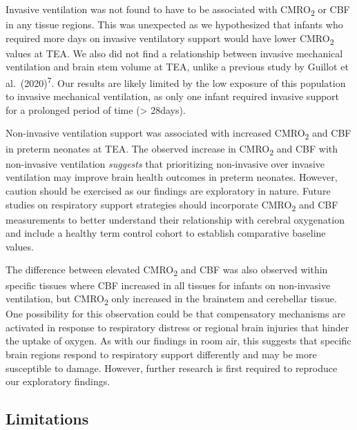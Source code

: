 \documentclass[
  letterpaper,
  DIV=11,
  numbers=noendperiod]{scrartcl}
\begin{document}
Invasive ventilation was not found to have to be associated with
CMRO\textsubscript{2} or CBF in any tissue regions. This was unexpected
as we hypothesized that infants who required more days on invasive
ventilatory support would have lower CMRO\textsubscript{2} values at
TEA. We also did not find a relationship between invasive mechanical
ventilation and brain stem volume at TEA, unlike a previous study by
Guillot et al.~(2020)\textsuperscript{7}. Our results are likely limited
by the low exposure of this population to invasive mechanical
ventilation, as only one infant required invasive support for a
prolonged period of time (\textgreater{} 28days).

Non-invasive ventilation support was associated with increased
CMRO\textsubscript{2} and CBF in preterm neonates at TEA. The observed
increase in CMRO\textsubscript{2} and CBF with non-invasive ventilation
\emph{suggests} that prioritizing non-invasive over invasive ventilation
may improve brain health outcomes in preterm neonates. However, caution
should be exercised as our findings are exploratory in nature. Future
studies on respiratory support strategies should incorporate
CMRO\textsubscript{2} and CBF measurements to better understand their
relationship with cerebral oxygenation and include a healthy term
control cohort to establish comparative baseline values.

The difference between elevated CMRO\textsubscript{2} and CBF was also
observed within specific tissues where CBF increased in all tissues for
infants on non-invasive ventilation, but CMRO\textsubscript{2} only
increased in the brainstem and cerebellar tissue. One possibility for
this observation could be that compensatory mechanisms are activated in
response to respiratory distress or regional brain injuries that hinder
the uptake of oxygen. As with our findings in room air, this suggests
that specific brain regions respond to respiratory support differently
and may be more susceptible to damage. However, further research is
first required to reproduce our exploratory findings.

\subsection{Limitations}\label{limitations}
\end{document}

